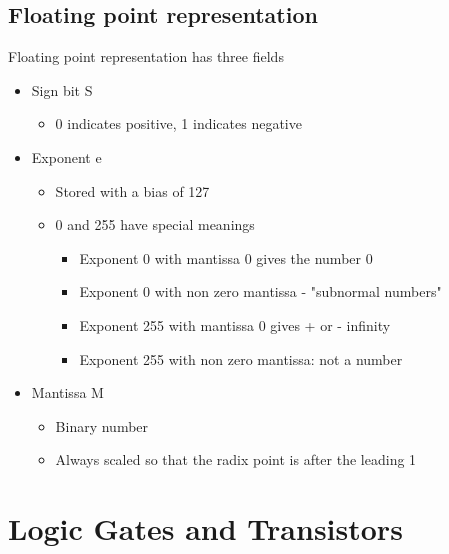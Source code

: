 \documentclass{article}[18pt]
\begin{document}
\subsection{Floating point representation}
Floating point representation has three fields
\begin{itemize}
	\item Sign bit S
	\begin{itemize}
		\item 0 indicates positive, 1 indicates negative
	\end{itemize}
	\item Exponent e
	\begin{itemize}
		\item Stored with a bias of 127
		\item 0 and 255 have special meanings
		\begin{itemize}
			\item Exponent 0 with mantissa 0 gives the number 0
			\item Exponent 0 with non zero mantissa - "subnormal numbers"
			\item Exponent 255 with mantissa 0 gives + or - infinity
			\item Exponent 255 with non zero mantissa: not a number
		\end{itemize}
	\end{itemize}
	\item Mantissa M
	\begin{itemize}
		\item Binary number
		\item Always scaled so that the radix point is after the leading 1
	\end{itemize}
\end{itemize}
\section{Logic Gates and Transistors}
\end{document}
